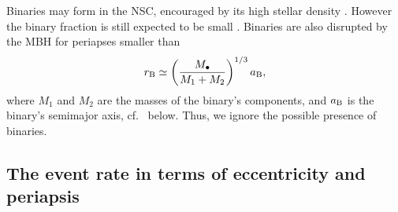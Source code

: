 Binaries may form in the NSC, encouraged by its high stellar density \citep{O'Leary2009}. However the binary fraction is still expected to be small \citep{Hopman2009}. Binaries are also disrupted by the MBH for periapses smaller than
\begin{equation}
r_\mathrm{B} \simeq \left(\dfrac{M_\bullet}{M_1 + M_2}\right)^{1/3}a_\mathrm{B},
\end{equation}
where $M_1$ and $M_2$ are the masses of the binary's components, and $a_\mathrm{B}$ is the binary's semimajor axis, cf.\  below. Thus, we ignore the possible presence of binaries.

\subsection{The event rate in terms of eccentricity and periapsis}\label{sec:e-rp}

